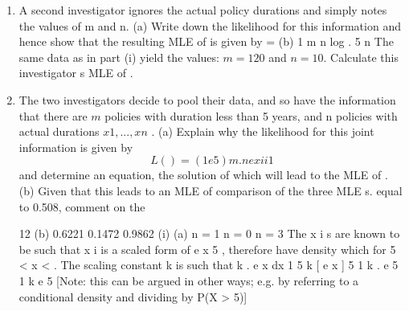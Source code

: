 \documentclass[a4paper,12pt]{article}
\begin{document}

\begin{enumerate}


12
A certain type of insurance policy has a claim rate of per year and the cover ceases and the policy expires after the first claim. Accordingly the duration of a policy is modelled by an exponential distribution with density function e x : 0 x
.
A company has data on (m + n) policies which have expired and which may beassumed to be independent. Of these, m policies had duration less than 5 years and n policies had duration greater than or equal to 5 years.
(i)
An investigator makes note of the actual durations, x 1 , , x n , of the latter group of n policies, but ignores the former group without even noting the value of m.
(a)
Explain why the x i s come from a truncated exponential distribution
with density function
f ( x ) = k . e
, 5
x
e 5 .
and show that k
(b)
x
Write down the likelihood for the data from the point of view of this investigator and hence show that the maximum likelihood estimate
(MLE) of is given by
n
n
.
x i 5 n
i 1
(c)
The data yield the values: n = 10 and x i = 71. Calculate this investigator s MLE of .

\item %
A second investigator ignores the actual policy durations and simply notes the values of m and n.
(a)
Write down the likelihood for this information and hence show that the resulting MLE of is given by
=
(b)
1
m n
log
.
5
n
The same data as in part (i) yield the values: $m = 120$ and $n = 10$.
Calculate this investigator s MLE of .
\item %
The two investigators decide to pool their data, and so have the information that there are $m$ policies with duration less than 5 years, and n policies with actual durations $x 1 , ... , x n$ .
(a)
Explain why the likelihood for this joint information is given by
\[L ( ) = (1 e
5
) m .
n
e
x i
i 1\]
and determine an equation, the solution of which will lead to the MLE
of .
(b)
Given that this leads to an MLE of comparison of the three MLE s.
equal to 0.508, comment on the

\newpage

12
(b) 0.6221
0.1472
0.9862
(i) (a)
n = 1
n = 0
n = 3
The x i s are known to be such that x i is a scaled form of e
x
5 , therefore have density which
for 5 < x < .
The scaling constant k is such that
k . e
x
dx 1
5
k [ e
x
] 5
1
k . e
5
1
k
e 5
[Note: this can be argued in other ways; e.g. by referring to a conditional density and dividing by P(X > 5)]


\end{enumerate}
\end{document}
